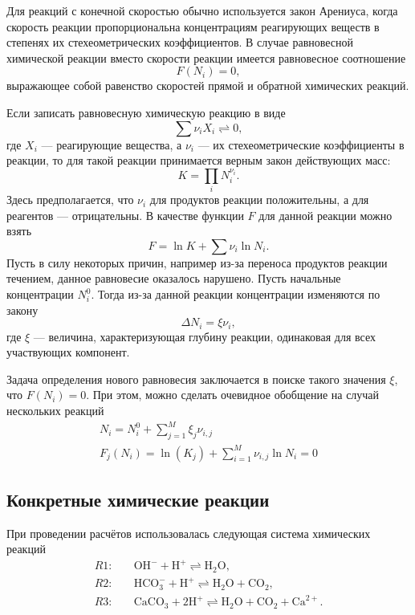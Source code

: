 \documentclass[14pt,a4paper]{extarticle}
\begin{document}
Для реакций с конечной скоростью обычно используется закон Арениуса, когда скорость реакции пропорциональна концентрациям реагирующих веществ в степенях их стехеометрических коэффициентов.
В случае равновесной химической реакции вместо скорости реакции имеется равновесное соотношение
$$F(N_i) = 0,$$
выражающее собой равенство скоростей прямой и обратной химических реакций.

Если записать равновесную химическую реакцию в виде 
$$\sum{\nu_i X_i} \rightleftharpoons 0,$$
где $X_i$ --- реагирующие вещества, а $\nu_i$ --- их стехеометрические коэффициенты в реакции, то для такой реакции принимается верным закон действующих масс:
$$
K = \prod_i N_i^{\nu_i}.
$$
Здесь предполагается, что $\nu_i$ для продуктов реакции положительны, а для реагентов --- отрицательны. В качестве функции $F$ для данной реакции можно взять 
$$F = \ln{K} + \sum{\nu_i \ln{N_i}}.$$
Пусть в силу  некоторых причин, например из-за переноса продуктов реакции течением, данное равновесие оказалось нарушено. Пусть начальные концентрации $N_i^0$. Тогда из-за данной реакции концентрации изменяются по закону $$\Delta N_i = \xi \nu_i,$$ где $\xi$ --- величина, характеризующая глубину реакции, одинаковая для всех участвующих компонент.

Задача определения нового равновесия заключается в поиске такого значения $\xi$, что $F(N_i) = 0$. При этом, можно сделать очевидное обобщение на случай нескольких реакций
\begin{gather*}
N_i = N_i^0 + \sum_{j=1}^{M} \xi_j\nu_{i,j}\\
F_j(N_i)=\ln(K_j) + \sum_{i=1}^{M} \nu_{i,j}\ln{N_i} = 0
\end{gather*}
 
\subsection{Конкретные химические реакции}

\newcommand{\OHm}{\text{OH}^-}
\newcommand{\Hp}{\text{H}^+}
\newcommand{\WAT}{\text{H}_2\text{O}}
\newcommand{\CARB}{\text{CO}_2}
\newcommand{\Catwop}{\text{Ca}^{2+}}
\newcommand{\Calcite}{\text{CaCO}_3}
\newcommand{\HCO}{\text{HCO}_3^{-}}
При проведении расчётов использовалась следующая система химических реакций
\begin{align*}
R1:&\quad \OHm + \Hp \rightleftharpoons \WAT,\\
R2:&\quad \HCO +\Hp \rightleftharpoons \WAT + \CARB,\\
R3:&\quad \Calcite + 2\Hp \rightleftharpoons \WAT + \CARB + \Catwop.
\end{align*}
\end{document}
